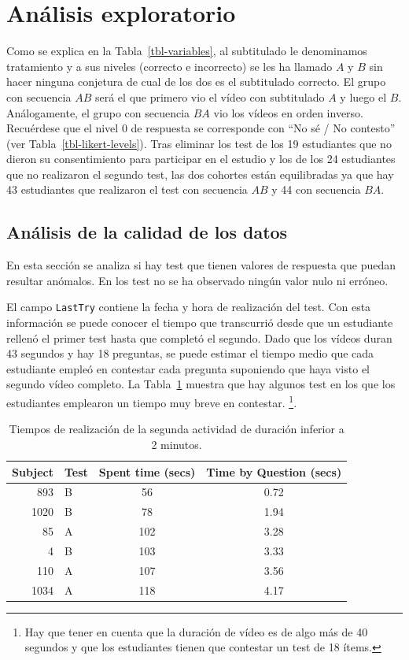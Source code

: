 \documentclass[
  12pt,
  a4paper,
  extrafontsizes,
  onecolumn,
  openright,
  table]{memoir}
\begin{document}
\hypertarget{sec-eda}{%
\section{Análisis exploratorio}\label{sec-eda}}

Como se explica en la Tabla~\ref{tbl-variables}, al subtitulado le
denominamos tratamiento y a sus niveles (correcto e incorrecto) se les
ha llamado \(A\) y \(B\) sin hacer ninguna conjetura de cual de los dos
es el subtitulado correcto. El grupo con secuencia \(AB\) será el que
primero vio el vídeo con subtitulado \(A\) y luego el \(B\).
Análogamente, el grupo con secuencia \(BA\) vio los vídeos en orden
inverso. Recuérdese que el nivel 0 de respuesta se corresponde con
\enquote{No sé / No contesto} (ver Tabla~\ref{tbl-likert-levels}). Tras
eliminar los test de los 19 estudiantes que no dieron su consentimiento
para participar en el estudio y los de los 24 estudiantes que no
realizaron el segundo test, las dos cohortes están equilibradas ya que
hay 43 estudiantes que realizaron el test con secuencia \(AB\) y 44 con
secuencia \(BA\).

\hypertarget{anuxe1lisis-de-la-calidad-de-los-datos}{%
\subsection{Análisis de la calidad de los
datos}\label{anuxe1lisis-de-la-calidad-de-los-datos}}

En esta sección se analiza si hay test que tienen valores de respuesta
que puedan resultar anómalos. En los test no se ha observado ningún
valor nulo ni erróneo.

El campo \texttt{LastTry} contiene la fecha y hora de realización del
test. Con esta información se puede conocer el tiempo que transcurrió
desde que un estudiante rellenó el primer test hasta que completó el
segundo. Dado que los vídeos duran 43 segundos y hay 18 preguntas, se
puede estimar el tiempo medio que cada estudiante empleó en contestar
cada pregunta suponiendo que haya visto el segundo vídeo completo. La
Tabla~\ref{tbl-washout} muestra que hay algunos test en los que los
estudiantes emplearon un tiempo muy breve en contestar. \footnote{Hay
  que tener en cuenta que la duración de vídeo es de algo más de 40
  segundos y que los estudiantes tienen que contestar un test de 18
  ítems.}.

\hypertarget{tbl-washout}{}
\begin{longtable}{rlcc}
\caption{\label{tbl-washout}Tiempos de realización de la segunda actividad de duración inferior a 2
minutos. }\tabularnewline

\toprule
Subject & Test & Spent time (secs) & Time by Question (secs) \\ 
\midrule
893 & B & 56 & 0.72 \\ 
1020 & B & 78 & 1.94 \\ 
85 & A & 102 & 3.28 \\ 
4 & B & 103 & 3.33 \\ 
110 & A & 107 & 3.56 \\ 
1034 & A & 118 & 4.17 \\ 
\bottomrule
\end{longtable}
\end{document}
